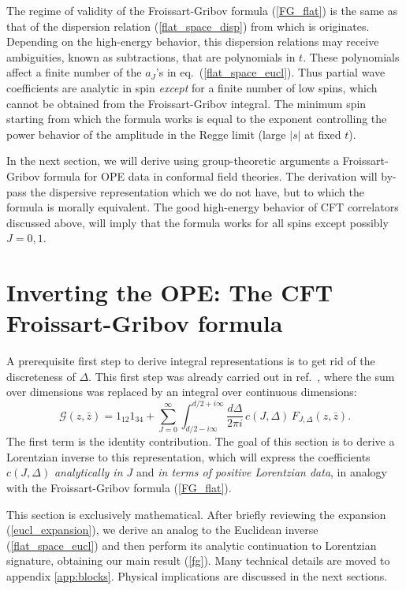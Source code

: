 \documentclass[11pt, reqno,preprint]{article}
\def\be{\begin{equation}}
\def\ee{\end{equation}}
\def\zbar{\bar{z}}
\def\j{J}
\def\c{c}
\def\GG{\mathcal{G}}
\begin{document}
The regime of validity of the Froissart-Gribov formula (\ref{FG_flat}) is the same as that of the dispersion relation (\ref{flat_space_disp}) from which is originates.
Depending on the high-energy behavior, this dispersion relations may receive ambiguities, known as subtractions,
that are polynomials in $t$.  These polynomials affect a finite number of the $a_\j$'s in eq.~(\ref{flat_space_eucl}).
Thus partial wave coefficients are analytic in spin \emph{except} for a finite number of low spins, which
cannot be obtained from the Froissart-Gribov integral.
The minimum spin starting from which the formula works is equal to the exponent controlling the power behavior of the amplitude
in the Regge limit (large $|s|$ at fixed $t$).

In the next section, we will derive using group-theoretic arguments a Froissart-Gribov formula for OPE data
in conformal field theories. The derivation will by-pass the dispersive representation which we do not have, but to which the formula
is morally equivalent. The good high-energy behavior of CFT correlators discussed above, will imply that the formula works for all spins except possibly $\j=0,1$.



\section{Inverting the OPE: The CFT Froissart-Gribov formula}\label{sec:fg}

A prerequisite first step to derive integral representations is to get rid of the discreteness
of $\Delta$.  This first step was already carried out in ref.~\cite{Costa:2012cb}, where the sum over dimensions
was replaced by an integral over continuous dimensions:
\be
 \GG(z,\zbar) = 1_{12}1_{34}+
 \sum_{\j=0}^\infty \int_{d/2-i\infty}^{d/2+i\infty} \frac{d\Delta}{2\pi i} \,\c(\j,\Delta)\,F_{\j,\Delta}(z,\zbar). \label{eucl_expansion}
\ee
The first term is the identity contribution.
The goal of this section is to derive a Lorentzian inverse to this representation, which will express the coefficients $\c(\j,\Delta)$
\emph{analytically in $\j$} and \emph{in terms of positive Lorentzian data}, in analogy with the Froissart-Gribov formula (\ref{FG_flat}).

This section is exclusively mathematical. After briefly reviewing the expansion (\ref{eucl_expansion}),
we derive an analog to the Euclidean inverse (\ref{flat_space_eucl}) and then perform its analytic continuation 
to Lorentzian signature, obtaining our main result (\ref{fg}).  Many technical details are moved to appendix \ref{app:blocks}.
Physical implications are discussed in the next sections.
\end{document}
